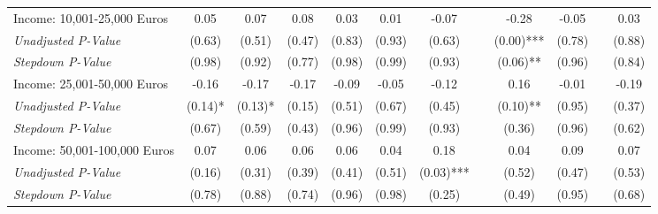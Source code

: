 \begin{tabular}{l c c c c c c c c c c c}
Income: 10,001-25,000 Euros & 0.05 & 0.07 & 0.08 & 0.03 & 0.01 & -0.07 & & -0.28 & -0.05 & & 0.03 \\
\quad \textit{Unadjusted P-Value} & (0.63) & (0.51) & (0.47) & (0.83) & (0.93) & (0.63) & & (0.00)*** & (0.78) & & (0.88) \\
\quad \textit{Stepdown P-Value} & (0.98) & (0.92) & (0.77) & (0.98) & (0.99) & (0.93) & & (0.06)** & (0.96) & & (0.84) \\
Income: 25,001-50,000 Euros & -0.16 & -0.17 & -0.17 & -0.09 & -0.05 & -0.12 & & 0.16 & -0.01 & & -0.19 \\
\quad \textit{Unadjusted P-Value} & (0.14)* & (0.13)* & (0.15) & (0.51) & (0.67) & (0.45) & & (0.10)** & (0.95) & & (0.37) \\
\quad \textit{Stepdown P-Value} & (0.67) & (0.59) & (0.43) & (0.96) & (0.99) & (0.93) & & (0.36) & (0.96) & & (0.62) \\
Income: 50,001-100,000 Euros & 0.07 & 0.06 & 0.06 & 0.06 & 0.04 & 0.18 & & 0.04 & 0.09 & & 0.07 \\
\quad \textit{Unadjusted P-Value} & (0.16) & (0.31) & (0.39) & (0.41) & (0.51) & (0.03)*** & & (0.52) & (0.47) & & (0.53) \\
\quad \textit{Stepdown P-Value} & (0.78) & (0.88) & (0.74) & (0.96) & (0.98) & (0.25) & & (0.49) & (0.95) & & (0.68) \\
\bottomrule
\end{tabular}
